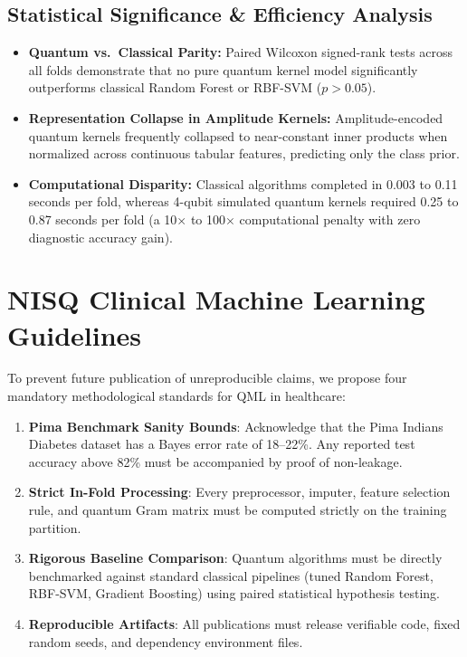 \documentclass[11pt,a4paper]{article}
\begin{document}
\subsection{Statistical Significance \& Efficiency Analysis}
\begin{itemize}[leftmargin=*]
  \item \textbf{Quantum vs.\ Classical Parity:} Paired Wilcoxon signed-rank tests across all folds demonstrate that no pure quantum kernel model significantly outperforms classical Random Forest or RBF-SVM ($p > 0.05$).
  \item \textbf{Representation Collapse in Amplitude Kernels:} Amplitude-encoded quantum kernels frequently collapsed to near-constant inner products when normalized across continuous tabular features, predicting only the class prior.
  \item \textbf{Computational Disparity:} Classical algorithms completed in 0.003 to 0.11 seconds per fold, whereas 4-qubit simulated quantum kernels required 0.25 to 0.87 seconds per fold (a 10$\times$ to 100$\times$ computational penalty with zero diagnostic accuracy gain).
\end{itemize}

\section{NISQ Clinical Machine Learning Guidelines}
To prevent future publication of unreproducible claims, we propose four mandatory methodological standards for QML in healthcare:
\begin{enumerate}
  \item \textbf{Pima Benchmark Sanity Bounds}: Acknowledge that the Pima Indians Diabetes dataset has a Bayes error rate of 18--22\%. Any reported test accuracy above 82\% must be accompanied by proof of non-leakage.
  \item \textbf{Strict In-Fold Processing}: Every preprocessor, imputer, feature selection rule, and quantum Gram matrix must be computed strictly on the training partition.
  \item \textbf{Rigorous Baseline Comparison}: Quantum algorithms must be directly benchmarked against standard classical pipelines (tuned Random Forest, RBF-SVM, Gradient Boosting) using paired statistical hypothesis testing.
  \item \textbf{Reproducible Artifacts}: All publications must release verifiable code, fixed random seeds, and dependency environment files.
\end{enumerate}
\end{document}
